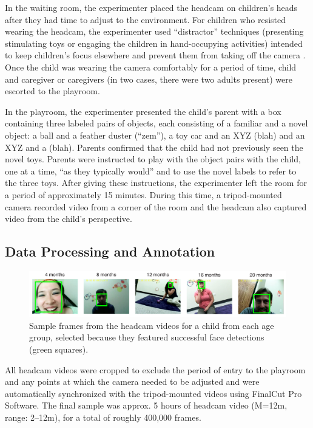 \documentclass[10pt,letterpaper]{article}
\begin{document}
In the waiting room, the experimenter placed the headcam on children's heads after they had time to adjust to the environment. For children who resisted wearing the headcam, the experimenter used ``distractor'' techniques (presenting stimulating toys or engaging the children in hand-occupying activities) intended to keep children's focus elsewhere and prevent them from taking off the camera \cite{yoshida2008}. Once the child was wearing the camera comfortably for a period of time, child and caregiver or caregivers (in two cases, there were two adults present) were escorted to the playroom. 

In the playroom, the experimenter presented the child's parent with a box containing three labeled pairs of objects, each consisting of a familiar and a novel object: a ball and a feather duster (``zem''), a toy car and an XYZ (blah) and an XYZ and a (blah). Parents confirmed that the child had not previously seen the novel toys. Parents were instructed to play with the object pairs with the child, one at a time, ``as they typically would'' and to use the novel labels to refer to the three toys. After giving these instructions, the experimenter left the room for a period of approximately 15 minutes. During this time, a tripod-mounted camera recorded video from a corner of the room and the headcam also captured video from the child's perspective. 

\subsection{Data Processing and Annotation}



\begin{figure}
\includegraphics[width=7in]{figures/framesample.pdf}
\caption{\label{fig:frames} Sample frames from the headcam videos for a child from each age group, selected because they featured successful face detections (green squares).} 
\end{figure}


All headcam videos were cropped to exclude the period of entry to the playroom and any points at which the camera needed to be adjusted and were automatically synchronized with the tripod-mounted videos using FinalCut Pro Software. The final sample was approx. 5 hours of headcam video (M=12m, range: 2--12m), for a total of roughly 400,000 frames. 
\end{document}
